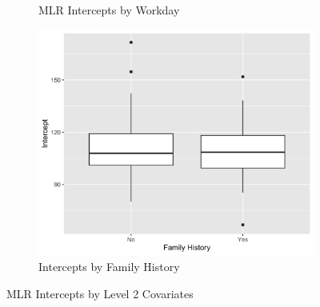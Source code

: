 \documentclass[12pt,twoside,letterpaper]{article}
\theoremstyle{definition}
\theoremstyle{definition}
\begin{document}
\begin{figure}
\begin{subfigure}[b]{0.32\textwidth}
    \caption[]%
    {{\small MLR Intercepts by Workday}}
    \label{fig: int v day}
    \end{subfigure}
    \hfill
    \begin{subfigure}[b]{0.32\textwidth}
    \centering
    \includegraphics[width=\textwidth]{pics/mlr int by fh.png}
    \caption[]%
    {{\small Intercepts by Family History}}
    \label{fig: int v fh}
    \end{subfigure}
    \caption[]
    {\small MLR Intercepts by Level 2 Covariates}
    \label{fig: int v lv2}
    \end{figure}
\end{document}
